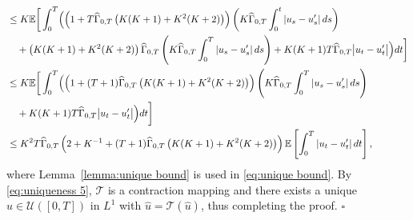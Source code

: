 \documentclass[12pt]{article}
\theoremstyle{named}
\numberwithin{equation}{section}
\def\P{{\mathord{\mathbb P}}}
\newenvironment{Proof}{\removelastskip\par\medskip \noindent{\em Proof.} \rm}{\penalty-20\null\hfill$\square$\par\medbreak}
\begin{document}
\begin{Proof}
\begin{align}
        &\leq K\mathbb{E}\bigg[ \int_0^T \Bigl( \left(1 + T\widehat{\Gamma}_{0,T} \left(K(K+1) + K^2(K+2)\right)\right)\left( K \widehat{\Gamma}_{0,T} \int_0^t \left\lvert u_s - u'_s\right\rvert ds \right) \nonumber\\
        & \quad + \left(K(K+1) + K^2(K+2)\right)\widehat{\Gamma}_{0,T}\left( K \widehat{\Gamma}_{0,T}\int_0^T \left\lvert u_s - u'_s\right\rvert ds \right) + K(K+1) T\widehat{\Gamma}_{0,T} \big| u_t - u'_t\big|\Bigr) dt \bigg] \nonumber\\
        &\leq K\mathbb{E}\bigg[ \int_0^T \Bigl( \left(1 + (T+1)\widehat{\Gamma}_{0,T} \left(K(K+1) + K^2(K+2)\right) \right)\left( K \widehat{\Gamma}_{0,T} \int_0^T \left\lvert u_s - u'_s\right\rvert ds \right) \nonumber\\
        & \quad + K(K+1) T\widehat{\Gamma}_{0,T} \big| u_t - u'_t\big|\Bigr) dt \bigg] \nonumber\\
        &\leq K^2T\widehat{\Gamma}_{0,T}\left(2 + K^{-1} + (T+1)\widehat{\Gamma}_{0,T} \left(K(K+1) + K^2(K+2)\right) \right)\mathbb{E}\left[ \int_0^T \left\lvert u_t - u'_t\right\rvert dt\right], \nonumber
\end{align}
 where Lemma~\ref{lemma:unique bound} is used in \eqref{eq:unique bound}.
 By \eqref{eq:uniqueness 5},
 $\mathcal{T}$ is a contraction mapping and
 there exists a unique $\hat{u}\in \mathcal{U}([0,T])$
 in $L^1$
 with $\hat{u} = \mathcal{T}(\hat{u})$,
 thus completing the proof.
\end{Proof}
\end{document}
